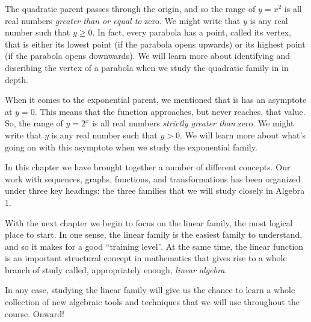 The quadratic parent passes through the origin, and so the range of $y=x^2$ is all real numbers \textit{greater than or equal to} zero. We might write that $y$ is any real number such that  $y\geq0$. In fact, every parabola has a point, called its \gls{vertex}, that is either its lowest point (if the parabola opens upwards) or its highest point (if the parabola opens downwards). We will learn more about identifying and describing the vertex of a parabola when we study the quadratic family in in depth.

When it comes to the exponential parent, we mentioned that is has an asymptote at $y=0$. This means that the function approaches, but never reaches, that value. So, the range of $y=2^x$ is all real numbers \textit{strictly greater than} zero. We might write that $y$ is any real number such that $y>0$. We will learn more about what's going on with this asymptote when we study the exponential family.

\chaptersummary

In this chapter we have brought together a number of different concepts. Our work with sequences, graphs, functions, and transformations has been organized under three key headings: the three families that we will study closely in Algebra 1.

With the next chapter we begin to focus on the linear family, the most logical place to start. In one sense, the linear family is the easiest family to understand, and so it makes for a good ``training level''. At the same time, the linear function is an important structural concept in mathematics that gives rise to a whole branch of study called, appropriately enough, \textit{linear algebra}.

In any case, studying the linear family will give us the chance to learn a whole collection of new algebraic tools and techniques that we will use throughout the course. Onward!
